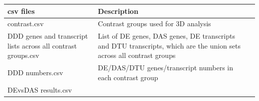 \documentclass[]{article}
\begin{document}
\begin{longtable}[]{@{}lll@{}}
\toprule
\begin{minipage}[b]{0.25\columnwidth}\raggedright\strut
csv files\strut
\end{minipage} & \begin{minipage}[b]{0.65\columnwidth}\raggedright\strut
Description\strut
\end{minipage} & \begin{minipage}[b]{0.02\columnwidth}\raggedright\strut
\strut
\end{minipage}\tabularnewline
\midrule
\endhead
\begin{minipage}[t]{0.25\columnwidth}\raggedright\strut
contrast.csv\strut
\end{minipage} & \begin{minipage}[t]{0.65\columnwidth}\raggedright\strut
Contrast groups used for 3D analysis\strut
\end{minipage} & \begin{minipage}[t]{0.02\columnwidth}\raggedright\strut
\strut
\end{minipage}\tabularnewline
\begin{minipage}[t]{0.25\columnwidth}\raggedright\strut
DDD genes and transcript lists across all contrast groups.csv\strut
\end{minipage} & \begin{minipage}[t]{0.65\columnwidth}\raggedright\strut
List of DE genes, DAS genes, DE transcripts and DTU transcripts, which
are the union sets across all contrast groups\strut
\end{minipage} & \begin{minipage}[t]{0.02\columnwidth}\raggedright\strut
\strut
\end{minipage}\tabularnewline
\begin{minipage}[t]{0.25\columnwidth}\raggedright\strut
DDD numbers.csv\strut
\end{minipage} & \begin{minipage}[t]{0.65\columnwidth}\raggedright\strut
DE/DAS/DTU genes/transcript numbers in each contrast group\strut
\end{minipage} & \begin{minipage}[t]{0.02\columnwidth}\raggedright\strut
\strut
\end{minipage}\tabularnewline
\begin{minipage}[t]{0.25\columnwidth}\raggedright\strut
DEvsDAS results.csv\strut
\end{minipage} & \begin{minipage}[t]{0.65\columnwidth}\raggedright\strut

\end{minipage}
\end{longtable}
\end{document}
